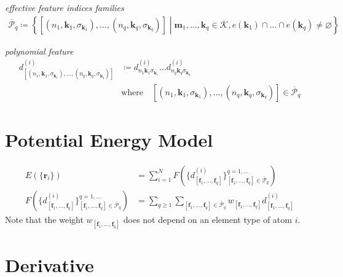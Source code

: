 \documentclass[a4paper, 11pt]{article}
\theoremstyle{definition}
\newcommand{\term}[1]{\textit{#1}}
\newcommand{\relmiddle}[1]{\mathrel{}\middle#1\mathrel{}}
\newcommand{\set}[2]{\left\{ #1 \relmiddle| #2 \right\}}
\begin{document}
\term{effective feature indices families}
\begin{align}
  \overline{\mathcal{P}}_{q}
  \coloneqq \set{[(n_{1}, \mathbf{k}_{1}, \sigma_{\mathbf{k}_{1}}), \dots, (n_{q}, \mathbf{k}_{q}, \sigma_{\mathbf{k}_{q}})]}{ \mathbf{m}_{1}, \dots, \mathbf{k}_{q} \in \overline{\mathcal{K}}, e(\mathbf{k}_{1}) \cap \dots \cap e(\mathbf{k}_{q}) \neq \varnothing }
\end{align}

\term{polynomial feature}
\begin{align}
  d^{(i)}_{[(n_{1}, \mathbf{k}_{1}, \sigma_{\mathbf{k}_{1}}), \dots, (n_{q}, \mathbf{k}_{q}, \sigma_{\mathbf{k}_{q}})]}
  &\coloneqq d^{(i)}_{ n_{1} \mathbf{k}_{1} \sigma_{\mathbf{k}_{1}} } \dots d^{(i)}_{ n_{q} \mathbf{k}_{q} \sigma_{\mathbf{k}_{q}} } \nonumber \\
  &\mbox{where} \quad
    [(n_{1}, \mathbf{k}_{1}, \sigma_{\mathbf{k}_{1}}), \dots, (n_{q}, \mathbf{k}_{q}, \sigma_{\mathbf{k}_{q}})] \in \overline{\mathcal{P}}_{q}
\end{align}


\section{Potential Energy Model}

\begin{align}
  E(\{ \mathbf{r}_{i} \}) &= \sum_{i=1}^{N} F \left( \{ d^{(i)}_{ [\mathbf{f}_{1}, \dots, \mathbf{f}_{q}] } \}_{[\mathbf{f}_{1}, \dots, \mathbf{f}_{q}] \in \overline{\mathcal{P}}_{q}}^{q=1,\dots} \right) \\
  F \left( \{ d^{(i)}_{ [\mathbf{f}_{1}, \dots, \mathbf{f}_{q}] } \}_{[\mathbf{f}_{1}, \dots, \mathbf{f}_{q}] \in \overline{\mathcal{P}}_{q}}^{q=1,\dots} \right)
  &= \sum_{q \geq 1} \sum_{ [\mathbf{f}_{1}, \dots, \mathbf{f}_{q}] \in \overline{\mathcal{P}}_{q} } w_{ [\mathbf{f}_{1}, \dots, \mathbf{f}_{q}] } d^{(i)}_{ [\mathbf{f}_{1}, \dots, \mathbf{f}_{q}] }
\end{align}
Note that the weight $w_{ [\mathbf{f}_{1}, \dots, \mathbf{f}_{q}] }$ does not depend on an element type of atom $i$.

\section{Derivative}
\end{document}
